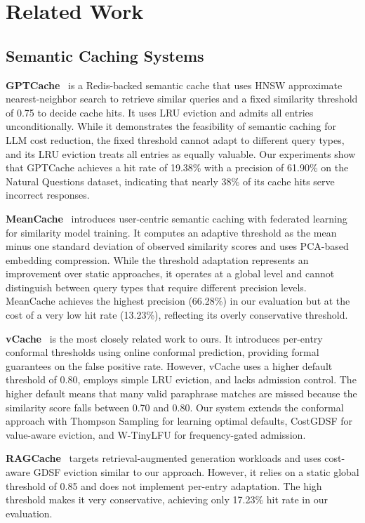 \documentclass[conference]{IEEEtran}
\begin{document}
\section{Related Work}

\subsection{Semantic Caching Systems}

\textbf{GPTCache}~\cite{regmi2024} is a Redis-backed semantic cache that uses HNSW approximate nearest-neighbor search to retrieve similar queries and a fixed similarity threshold of 0.75 to decide cache hits. It uses LRU eviction and admits all entries unconditionally. While it demonstrates the feasibility of semantic caching for LLM cost reduction, the fixed threshold cannot adapt to different query types, and its LRU eviction treats all entries as equally valuable. Our experiments show that GPTCache achieves a hit rate of 19.38\% with a precision of 61.90\% on the Natural Questions dataset, indicating that nearly 38\% of its cache hits serve incorrect responses.

\textbf{MeanCache}~\cite{gill2024} introduces user-centric semantic caching with federated learning for similarity model training. It computes an adaptive threshold as the mean minus one standard deviation of observed similarity scores and uses PCA-based embedding compression. While the threshold adaptation represents an improvement over static approaches, it operates at a global level and cannot distinguish between query types that require different precision levels. MeanCache achieves the highest precision (66.28\%) in our evaluation but at the cost of a very low hit rate (13.23\%), reflecting its overly conservative threshold.

\textbf{vCache}~\cite{schroeder2025} is the most closely related work to ours. It introduces per-entry conformal thresholds using online conformal prediction, providing formal guarantees on the false positive rate. However, vCache uses a higher default threshold of 0.80, employs simple LRU eviction, and lacks admission control. The higher default means that many valid paraphrase matches are missed because the similarity score falls between 0.70 and 0.80. Our system extends the conformal approach with Thompson Sampling for learning optimal defaults, CostGDSF for value-aware eviction, and W-TinyLFU for frequency-gated admission.

\textbf{RAGCache}~\cite{jin2024} targets retrieval-augmented generation workloads and uses cost-aware GDSF eviction similar to our approach. However, it relies on a static global threshold of 0.85 and does not implement per-entry adaptation. The high threshold makes it very conservative, achieving only 17.23\% hit rate in our evaluation.
\end{document}
